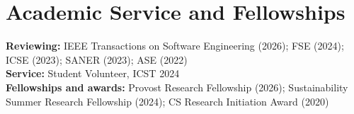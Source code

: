 \documentclass[a4paper,10pt]{article}
\begin{document}
\section{Academic Service and Fellowships}
\textbf{Reviewing:} IEEE Transactions on Software Engineering (2026); FSE (2024); ICSE (2023); SANER (2023); ASE (2022)\\
\textbf{Service:} Student Volunteer, ICST 2024\\
\textbf{Fellowships and awards:} Provost Research Fellowship (2026); Sustainability Summer Research Fellowship (2024); CS Research Initiation Award (2020)
\end{document}
